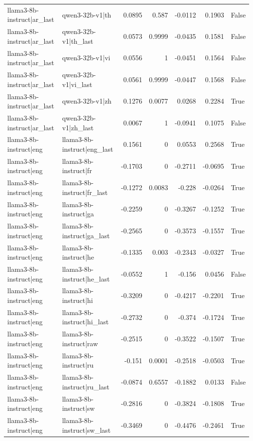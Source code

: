\begin{table}
\begin{tabular}{l l r r r r l}
llama3-8b-instruct|ar_last & qwen3-32b-v1|th & 0.0895 & 0.587 & -0.0112 & 0.1903 & False \\
llama3-8b-instruct|ar_last & qwen3-32b-v1|th_last & 0.0573 & 0.9999 & -0.0435 & 0.1581 & False \\
llama3-8b-instruct|ar_last & qwen3-32b-v1|vi & 0.0556 & 1 & -0.0451 & 0.1564 & False \\
llama3-8b-instruct|ar_last & qwen3-32b-v1|vi_last & 0.0561 & 0.9999 & -0.0447 & 0.1568 & False \\
llama3-8b-instruct|ar_last & qwen3-32b-v1|zh & 0.1276 & 0.0077 & 0.0268 & 0.2284 & True \\
llama3-8b-instruct|ar_last & qwen3-32b-v1|zh_last & 0.0067 & 1 & -0.0941 & 0.1075 & False \\
llama3-8b-instruct|eng & llama3-8b-instruct|eng_last & 0.1561 & 0 & 0.0553 & 0.2568 & True \\
llama3-8b-instruct|eng & llama3-8b-instruct|fr & -0.1703 & 0 & -0.2711 & -0.0695 & True \\
llama3-8b-instruct|eng & llama3-8b-instruct|fr_last & -0.1272 & 0.0083 & -0.228 & -0.0264 & True \\
llama3-8b-instruct|eng & llama3-8b-instruct|ga & -0.2259 & 0 & -0.3267 & -0.1252 & True \\
llama3-8b-instruct|eng & llama3-8b-instruct|ga_last & -0.2565 & 0 & -0.3573 & -0.1557 & True \\
llama3-8b-instruct|eng & llama3-8b-instruct|he & -0.1335 & 0.003 & -0.2343 & -0.0327 & True \\
llama3-8b-instruct|eng & llama3-8b-instruct|he_last & -0.0552 & 1 & -0.156 & 0.0456 & False \\
llama3-8b-instruct|eng & llama3-8b-instruct|hi & -0.3209 & 0 & -0.4217 & -0.2201 & True \\
llama3-8b-instruct|eng & llama3-8b-instruct|hi_last & -0.2732 & 0 & -0.374 & -0.1724 & True \\
llama3-8b-instruct|eng & llama3-8b-instruct|raw & -0.2515 & 0 & -0.3522 & -0.1507 & True \\
llama3-8b-instruct|eng & llama3-8b-instruct|ru & -0.151 & 0.0001 & -0.2518 & -0.0503 & True \\
llama3-8b-instruct|eng & llama3-8b-instruct|ru_last & -0.0874 & 0.6557 & -0.1882 & 0.0133 & False \\
llama3-8b-instruct|eng & llama3-8b-instruct|sw & -0.2816 & 0 & -0.3824 & -0.1808 & True \\
llama3-8b-instruct|eng & llama3-8b-instruct|sw_last & -0.3469 & 0 & -0.4476 & -0.2461 & True \\

\end{tabular}
\end{table}
